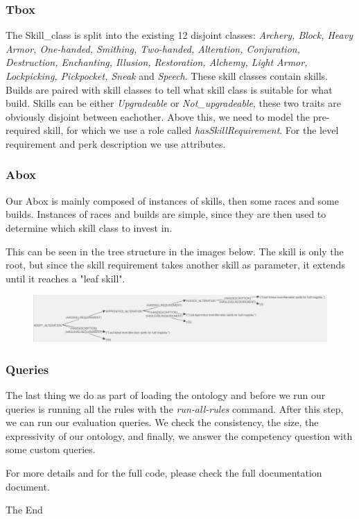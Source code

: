 \documentclass{beamer}
\begin{document}

\begin{frame}
\frametitle{Tbox}

The Skill\_class is split into the existing 12 disjoint classes: \textit{Archery, Block, Heavy Armor, One-handed, Smithing, Two-handed, Alteration, Conjuration, Destruction, Enchanting, Illusion, Restoration, Alchemy, Light Armor, Lockpicking, Pickpocket, Sneak} and \textit{Speech}. These skill classes contain skills. Builds are paired with skill classes to tell what skill class is suitable for what build.
\newline
\newline
Skills can be either \textit{Upgradeable} or \textit{Not\_upgradeable}, these two traits are obviously disjoint between eachother. Above this, we need to model the pre-required skill, for which we use a role called \textit{hasSkillRequirement}. For the level requirement and perk description we use attributes.

\end{frame}


\begin{frame}
\frametitle{Abox}

Our Abox is mainly composed of instances of skills, then some races and some builds.
Instances of races and builds are simple, since they are then used to determine which skill class to invest in.

This can be seen in the tree structure in the images below. The skill is only the root, but since the skill requirement takes another skill as parameter, it extends until it reaches a "leaf skill".

\begin{figure}[h]
\includegraphics[scale=0.5]{abox_adept_alteration.png}
\end{figure}

\end{frame}


\begin{frame}
\frametitle{Queries}

The last thing we do as part of loading the ontology and before we run our queries is running all the rules with the \textit{run-all-rules} command. After this step, we can run our evaluation queries.
We check the consistency, the size, the expressivity of our ontology, and finally, we answer the competency question with some custom queries.

For more details and for the full code, please check the full documentation document.

\end{frame}


\begin{frame}
\Huge{\centerline{The End}}
\end{frame}

\end{document}

